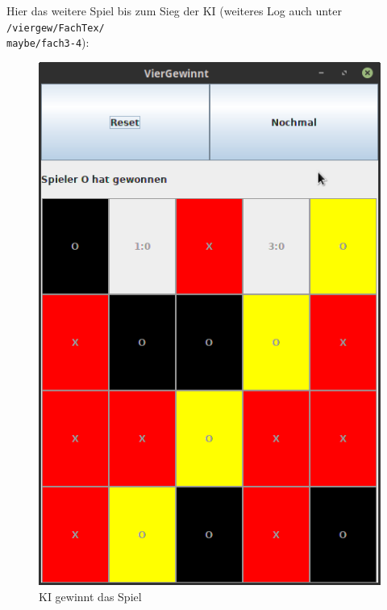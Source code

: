 \documentclass[12pt,a4paper]{article}
\def\code#1{\texttt{#1}}
\begin{document}
	Hier das weitere Spiel bis zum Sieg der KI (weiteres Log auch unter \code{/viergew/FachTex/}\\
	\code{maybe/fach3-4}):
	\begin{figure}[h]
		\centering
		\includegraphics[width=0.4\linewidth, height=0.3\textheight]{maybe/fach4}
		\caption{KI gewinnt das Spiel}
		\label{fig:fach4}
	\end{figure}
\end{document}
